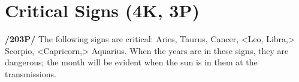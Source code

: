 \section{Critical Signs (4K, 3P)}

\textbf{/203P/} The following signs are critical: Aries, Taurus, Cancer, <Leo, Libra,> Scorpio, <Capricorn,>
Aquarius. When the years are in these signs, they are dangerous; the month will be evident when the sun
is in them at the transmissions.

\newpage